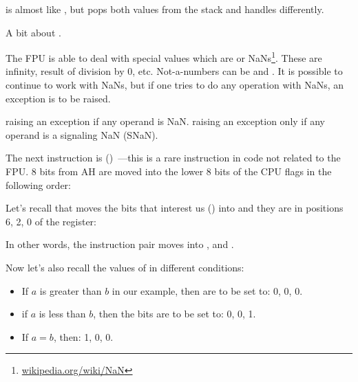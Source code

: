 



\FUCOMPP{} is almost like \FCOM, but pops both values from the stack and handles
 differently.

A bit about .

\newcommand{\NANFN}{\footnote{\href{http://go.yurichev.com/17130}{wikipedia.org/wiki/NaN}}}

The FPU is able to deal with special values which are  or \gls{NaN}s\NANFN. 
These are infinity, result of division by 0, etc.
Not-a-numbers can be  and . It is possible to continue to work with  NaNs, 
but if one tries to do any operation with  NaNs, an exception is to be raised.


\FCOM raising an exception if any operand is \gls{NaN}. 
\FUCOM raising an exception only if any operand is a signaling \gls{NaN} (SNaN).

\label{SAHF}

The next instruction is \SAHF ()~---this is a rare 
instruction in code not related to the FPU. 
8 bits from AH are moved into the lower 8 bits of the CPU flags in the following order:




Let's recall that \FNSTSW moves the bits that interest us (\CThreeBits) into \AH 
and they are in positions 6, 2, 0 of the \AH register:



In other words, the  instruction pair moves \CThreeBits into \ZF, \PF and \CF.

Now let's also recall the values of \CThreeBits in different conditions:

\begin{itemize}
\item If $a$ is greater than $b$ in our example, then \CThreeBits are to be set to: 0, 0, 0.
\item if $a$ is less than $b$, then the bits are to be set to: 0, 0, 1.
\item If $a=b$, then: 1, 0, 0.
\end{itemize}

